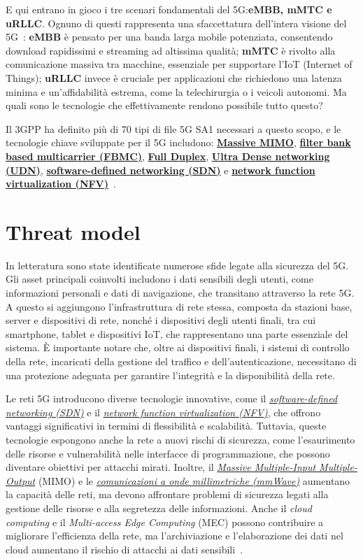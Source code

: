\documentclass[english]{article}
\begin{document}
E qui entrano in gioco i tre scenari fondamentali del 5G:\@ \textbf{eMBB, mMTC
	e uRLLC}. Ognuno di questi rappresenta una sfaccettatura dell'intera visione
del 5G~\cite{Ji2018Overview}: \textbf{eMBB} è pensato per una banda larga
mobile potenziata, consentendo download rapidissimi e streaming ad altissima
qualità; \textbf{mMTC} è rivolto alla comunicazione massiva tra macchine,
essenziale per supportare l’IoT (Internet of Things); \textbf{uRLLC} invece è
cruciale per applicazioni che richiedono una latenza minima e un'affidabilità
estrema, come la telechirurgia o i veicoli autonomi. Ma quali sono le
tecnologie che effettivamente rendono possibile tutto questo?

Il 3GPP ha definito più di 70 tipi di file 5G SA1 necessari a questo scopo, e
le tecnologie chiave sviluppate per il 5G includono:
\textbf{\hyperlink{MIMO}{Massive MIMO}}, \textbf{\hyperlink{FBMC}{filter bank
		based multicarrier (FBMC)}}, \textbf{\hyperlink{FullDuplex}{Full Duplex}},
\textbf{\hyperlink{UDN}{Ultra Dense networking (UDN)}},
\textbf{\hyperlink{SDN}{software-defined networking (SDN)}} e
\textbf{\hyperlink{NFV}{network function virtualization
		(NFV)}}~\cite{Ji2018Overview}.
\section{Threat model}
In letteratura sono state identificate numerose sfide legate alla sicurezza del
5G. Gli asset principali coinvolti includono i dati sensibili degli utenti,
come informazioni personali e dati di navigazione, che transitano attraverso la
rete 5G. A questo si aggiungono l'infrastruttura di rete stessa, composta da
stazioni base, server e dispositivi di rete, nonché i dispositivi degli utenti
finali, tra cui smartphone, tablet e dispositivi IoT, che rappresentano una
parte essenziale del sistema. È importante notare che, oltre ai dispositivi
finali, i sistemi di controllo della rete, incaricati della gestione del
traffico e dell'autenticazione, necessitano di una protezione adeguata per
garantire l'integrità e la disponibilità della rete.

Le reti 5G introducono diverse tecnologie innovative, come il
\textit{\hyperlink{SDN}{software-defined networking (SDN)}} e il
\textit{\hyperlink{NFV}{network function virtualization (NFV)}}, che offrono
vantaggi significativi in termini di flessibilità e scalabilità. Tuttavia,
queste tecnologie espongono anche la rete a nuovi rischi di sicurezza, come
l'esaurimento delle risorse e vulnerabilità nelle interfacce di programmazione,
che possono diventare obiettivi per attacchi mirati. Inoltre, il
\textit{\hyperlink{MIMO}{Massive Multiple-Input Multiple-Output}} (MIMO) e le
\textit{\hyperlink{mmWave}{comunicazioni a onde millimetriche (mmWave)}}
aumentano la capacità delle reti, ma devono affrontare problemi di sicurezza
legati alla gestione delle risorse e alla segretezza delle informazioni. Anche
il \textit{cloud computing} e il \textit{Multi-access Edge Computing} (MEC)
possono contribuire a migliorare l'efficienza della rete, ma l'archiviazione e
l'elaborazione dei dati nel cloud aumentano il rischio di attacchi ai dati
sensibili~\cite{Ahmad2019Security}.
\end{document}
